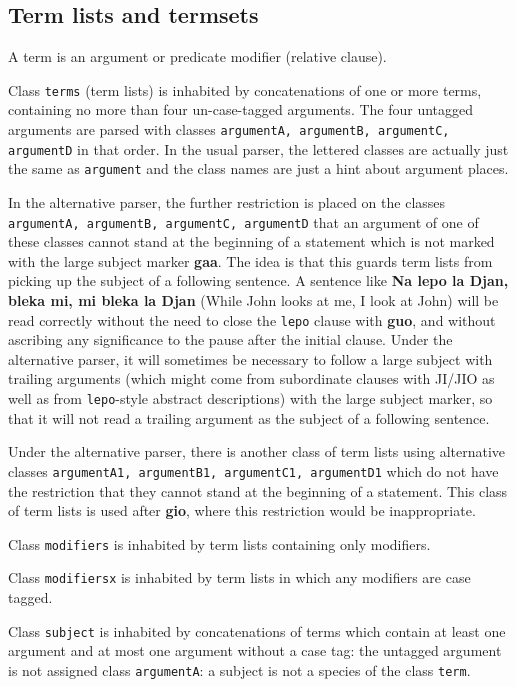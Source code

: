 \documentclass[12pt]{book}
\begin{document}
{\subsection{Term lists and termsets}

A term is an argument or predicate modifier (relative clause).

Class {\tt terms} (term lists) is inhabited by concatenations of one or more terms, containing no more than four
un-case-tagged arguments.  The four untagged arguments are parsed with 
classes {\tt argumentA, argumentB, argumentC, argumentD} in that order.  In the usual parser, the lettered classes are actually just the same as {\tt argument} and the class names are just a hint about argument places.  

In the alternative parser, the further restriction is placed on the classes
 {\tt argumentA, argumentB, argumentC, argumentD} that an argument of one of these classes cannot stand at the beginning of a statement which is not marked
with the large subject marker {\bf gaa}.  The idea is that this guards term lists from picking up the subject of a following sentence.
A sentence like {\bf Na lepo la Djan, bleka mi, mi bleka la Djan} (While John looks at me, I look at John) will be read correctly without the need
to close the {\tt lepo} clause with {\bf guo}, and without ascribing any significance to the pause after the initial clause.  Under the alternative parser,
it will sometimes be necessary to follow a large subject with trailing arguments (which might come from subordinate clauses with JI/JIO as well as from
{\tt lepo}-style abstract descriptions) with the large subject marker, so that it will not read a trailing argument as the subject of a following sentence.

Under the alternative parser, there is another class of term lists using alternative classes {\tt argumentA1, argumentB1, argumentC1, argumentD1} which
do not have the restriction that they cannot stand at the beginning of a statement.  This class of term lists is used after {\bf gio}, where this restriction would be inappropriate.

Class {\tt modifiers} is inhabited by term lists containing only modifiers.

Class {\tt modifiersx} is inhabited by term lists in which any modifiers are case tagged.

Class {\tt subject} is inhabited by concatenations of terms which contain at least one argument and at most one argument without a case tag:
the untagged argument is not assigned class {\tt argumentA}:  a subject is not a species of the class {\tt term}.  

}
\end{document}
